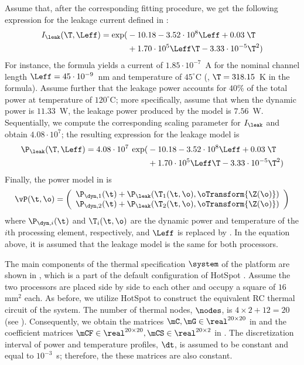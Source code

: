 Assume that, after the corresponding fitting procedure, we get the following expression for the leakage current defined in :
\begin{align*}
  I_\leak(\T, \Leff) = \exp(& -10.18 - 3.52 \cdot 10^8 \Leff + 0.03 \; \T \\
    & + 1.70 \cdot 10^5 \Leff \T - 3.33 \cdot 10^{-5} \T^2)
\end{align*}
For instance, the formula yields a current of $1.85 \cdot 10^{-7}$~A for the nominal channel length $\Leff = 45 \cdot 10^{-9}$~nm and temperature of $45^\circ$C (\ie, $\T = 318.15$~K in the formula). Assume further that the leakage power accounts for $40\%$ of the total power at temperature of $120^\circ$C; more specifically, assume that when the dynamic power is $11.33$~W, the leakage power produced by the model is $7.56$~W. Sequentially, we compute the corresponding scaling parameter for $I_\leak$ and obtain $4.08 \cdot 10^7$; the resulting expression for the leakage model is
\begin{align*}
  \P_\leak(\T, \Leff) = 4.08 \cdot 10^7 \: \exp(& -10.18 - 3.52 \cdot 10^8 \Leff + 0.03 \; \T \\
    & + 1.70 \cdot 10^5 \Leff \T - 3.33 \cdot 10^{-5} \T^2)
\end{align*}
Finally, the power model in  is
\[
  \vP(\t, \o) =
    \left(
      \begin{array}{c}
        \P_{\dyn, 1}(\t) + \P_{\leak}(\T_1(\t, \o), \oTransform{\Z(\o)}) \\
        \P_{\dyn, 2}(\t) + \P_{\leak}(\T_2(\t, \o), \oTransform{\Z(\o)})
      \end{array}
    \right)
\]
where $\P_{\dyn, i}(\t)$ and $\T_i(\t, \o)$ are the dynamic power and temperature of the $i$th processing element, respectively, and $\Leff$ is replaced by . In the equation above, it is assumed that the leakage model is the same for both processors.

 The main components of the thermal specification $\system$ of the platform are shown in , which is a part of the default configuration of HotSpot \cite{hotspot}. Assume the two processors are placed side by side to each other and occupy a square of $16$ $\text{mm}^2$ each. As before, we utilize HotSpot to construct the equivalent RC thermal circuit of the system. The number of thermal nodes, $\nodes$, is $4 \times 2 + 12 = 20$ (see ). Consequently, we obtain the matrices $\mC, \mG \in \real^{20 \times 20}$ in  and the coefficient matrices $\mCF \in \real^{20 \times 20}, \mCS \in \real^{20 \times 2}$ in . The discretization interval of power and temperature profiles, $\dt$, is assumed to be constant and equal to $10^{-3}$~s; therefore, the these matrices are also constant.


